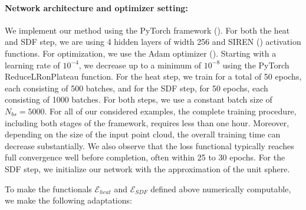 \documentclass[12pt,openany]{book}
\theoremstyle{plainnormal}
\theoremstyle{remark}
\begin{document}
\paragraph{Network architecture and optimizer setting:} We implement our method using the PyTorch framework (\cite{pytorch}). For both the heat and SDF step, we are using 4 hidden layers of width 256 and SIREN (\cite{sitzmann2020implicitneuralrepresentationsperiodic}) activation functions. For optimization, we use the Adam optimizer (\cite{kingma2017adammethodstochasticoptimization}). Starting with a learning rate of $10^{-4}$, we decrease up to a minimum of $10^{-8}$ using the PyTorch ReduceLRonPlateau function. For the heat step, we train for a total of 50 epochs, each consisting of 500 batches, and for the SDF step, for 50 epochs, each consisting of 1000 batches. For both steps, we use a constant batch size of $N_{bs} = 5000.$ For all of our considered examples, the complete training procedure, including both stages of the framework, requires less than one hour. Moreover, depending on the size of the input point cloud, the overall training time can decrease substantially. We also observe that the loss functional typically reaches full convergence well before completion, often within 25 to 30 epochs. For the SDF step, we initialize our network with the approximation of the unit sphere. \par
To make the functionals $\mathcal{E}_{heat}$ and $\mathcal{E}_{SDF}$ defined above numerically computable, we make the following adaptations:
\end{document}
